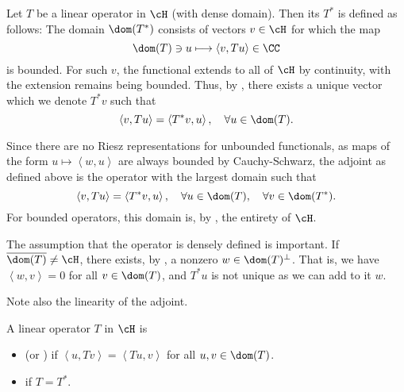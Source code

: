 \documentclass[oneside,reqno,letterpaper]{amsart}
\begin{document}
\begin{definition}
  Let \(T\) be a linear operator in \(\cH\) (with dense domain).
  Then its  \(T^*\) is defined as follows: 
  The domain \(\dom(T^*)\) consists of vectors \(v \in \cH\) for which the map 
  \[
    \dom(T) \ni u \longmapsto  \left< v, T u \right> \in \CC
  \] 
  is bounded. 
  For such \(v\), the functional extends to all of \(\cH\) by continuity, with the extension remains being bounded. 
  Thus, by , there exists a unique vector which we denote \(T^* v\) such that 
  \[
    \left< v, Tu \right> = \left< T^* v, u \right>, \quad \forall u \in \dom(T) . 
  \] 
\end{definition}

Since there are no Riesz representations for unbounded functionals, as maps of the form \(u \mapsto \left< w, u \right>\) are always bounded by Cauchy-Schwarz, the adjoint as defined above is the operator with the largest domain such that   
\[
  \left< v, T u \right> = \left< T^* v, u \right>, \quad \forall u \in \dom(T), \quad \forall v \in \dom(T^*). 
\]
For bounded operators, this domain is, by , the entirety of \(\cH\). 


The assumption that the operator is densely defined is important. 
If \(\overline{\dom(T)} \neq \cH\), there exists, by , a nonzero \(w \in \dom(T)^\perp\).
That is, we have \(\left< w, v \right> = 0\) for all \(v \in \dom(T)\), and \(T^* u\) is not unique as we can add to it \(w\). 

Note also the linearity of the adjoint.






\begin{definition}
  A linear operator \(T\) in \(\cH\) is 
  \begin{itemize}
    \item {} (or ) if \(\left< u, Tv \right> = \left< Tu, v \right>\) for all \(u, v \in \dom(T)\). 
  \item {} if \(T = T^*\). 
  \end{itemize}
\end{definition}
\end{document}
